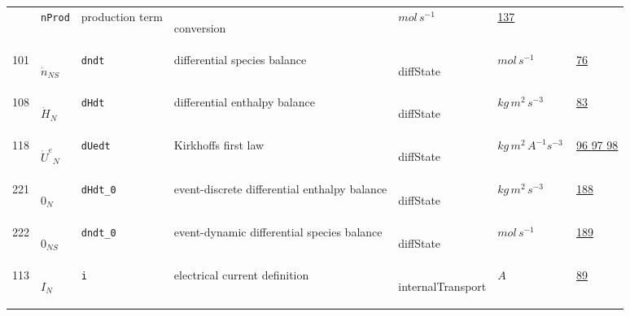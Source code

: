 \begin{longtable}{|p{1cm}|p{2.5cm}|p{4.5cm}|p{8cm}|p{3.0cm}|p{3cm}|p{1cm}|}
             & \verb|nProd|
             & production term
             & \begin{lay}conversion \end{lay}
             & $ mol \,s^{-1} \, $
             &                 \hyperlink{"e:137"}{ 137 }
                 \\
            101
             & \hypertarget{"v:101"}{ $ {\dot{n}}{_{{N S}}} $}
             & \verb|dndt|
             & differential species balance
             & \begin{lay}diffState \end{lay}
             & $ mol \,s^{-1} \, $
             &                 \hyperlink{"e:76"}{ 76 }
                 \\
            108
             & \hypertarget{"v:108"}{ $ {{\dot{H}}}{_{N}} $}
             & \verb|dHdt|
             & differential enthalpy balance
             & \begin{lay}diffState \end{lay}
             & $ kg \,m^{2} \,s^{-3} \, $
             &                 \hyperlink{"e:83"}{ 83 }
                 \\
            118
             & \hypertarget{"v:118"}{ $ {{\dot{U}^e}}{_{N}} $}
             & \verb|dUedt|
             & Kirkhoffs first law
             & \begin{lay}diffState \end{lay}
             & $ kg \,m^{2} \,A^{-1} s^{-3} \, $
             &                 \hyperlink{"e:96"}{ 96 }
                                 \hyperlink{"e:97"}{ 97 }
                                 \hyperlink{"e:98"}{ 98 }
                 \\
            221
             & \hypertarget{"v:221"}{ $ {0}{_{N}} $}
             & \verb|dHdt_0|
             & event-discrete differential enthalpy balance
             & \begin{lay}diffState \end{lay}
             & $ kg \,m^{2} \,s^{-3} \, $
             &                 \hyperlink{"e:188"}{ 188 }
                 \\
            222
             & \hypertarget{"v:222"}{ $ {0}{_{{N S}}} $}
             & \verb|dndt_0|
             & event-dynamic differential species balance
             & \begin{lay}diffState \end{lay}
             & $ mol \,s^{-1} \, $
             &                 \hyperlink{"e:189"}{ 189 }
                 \\
            113
             & \hypertarget{"v:113"}{ $ {I}{_{N}} $}
             & \verb|i|
             & electrical current definition
             & \begin{lay}internalTransport \end{lay}
             & $ A \, $
             &                 \hyperlink{"e:89"}{ 89 }
                 \\
    \end{longtable}